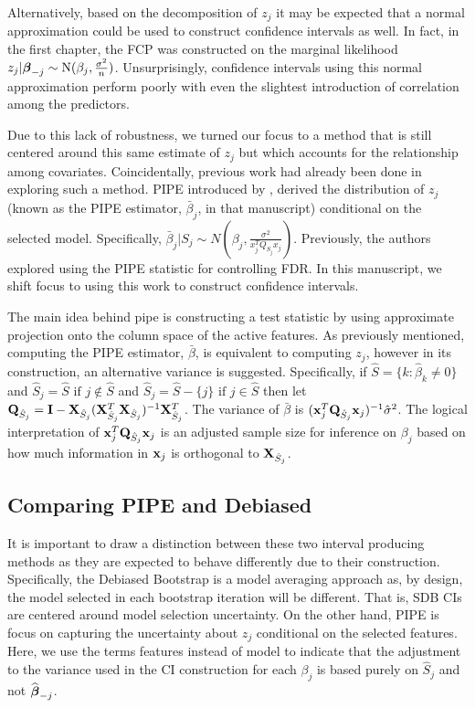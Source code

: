 Alternatively, based on the decomposition of $z_j$ it may be expected that a normal approximation could be used to construct confidence intervals as well. In fact, in the first chapter, the FCP was constructed on the marginal likelihood $z_j | \boldsymbol{\beta}_{-j} \sim \textrm{N}(\beta_j, \frac{\sigma^2}{n})$. Unsurprisingly, confidence intervals using this normal approximation perform poorly with even the slightest introduction of correlation among the predictors. 

Due to this lack of robustness, we turned our focus to a method that is still centered around this same estimate of $z_j$ but which accounts for the relationship among covariates. Coincidentally, previous work had already been done in exploring such a method. PIPE introduced by , derived the distribution of $z_j$ (known as the PIPE estimator, $\bar{\beta}_j$, in that manuscript) conditional on the selected model. Specifically, $\bar{\beta}_j | S_j \sim N(\beta_j, \frac{\sigma^2}{x_j^T Q_{S_j} x_j})$. Previously, the authors explored using the PIPE statistic for controlling FDR. In this manuscript, we shift focus to using this work to construct confidence intervals.

The main idea behind pipe is constructing a test statistic by using approximate projection onto the column space of the active features. As previously mentioned, computing the PIPE estimator, $\bar{\beta}$, is equivalent to computing $z_j$, however in its construction, an alternative variance is suggested. Specifically, if $\hat{S} = \lbrace k: \hat{\beta}_k \neq  0 \rbrace$ and $\hat{S}_j = \hat{S} \text{ if } j \notin \hat{S}$ and $\hat{S}_j = \hat{S} - \lbrace j \rbrace \text{ if } j \in \hat{S}$  then let $\mathbf{Q}_{\hat{S}_j} = \mathbf{I} - \mathbf{X}_{\hat{S}_j}(\mathbf{X}_{\hat{S}_j}^T \mathbf{X}_{\hat{S}_j})^{-1} \mathbf{X}_{\hat{S}_j}^T$. The variance of $\bar{\beta}$ is $(\mathbf{x}_j^T \mathbf{Q}_{\hat{S}_j} \mathbf{x}_j)^{-1}\hat{\sigma}^2$. The logical interpretation of $\mathbf{x}_j^T \mathbf{Q}_{\hat{S}_j} \mathbf{x}_j$ is an adjusted sample size for inference on $\beta_j$ based on how much information in $\mathbf{x}_j$ is orthogonal to $\mathbf{X}_{\hat{S}_j}$. 

\subsection{Comparing PIPE and Debiased}

It is important to draw a distinction between these two interval producing methods as they are expected to behave differently due to their construction. Specifically, the Debiased Bootstrap is a model averaging approach as, by design, the model selected in each bootstrap iteration will be different. That is, SDB CIs are centered around model selection uncertainty. On the other hand, PIPE is focus on capturing the uncertainty about $z_j$ conditional on the selected features. Here, we use the terms features instead of model to indicate that the adjustment to the variance used in the CI construction for each $\beta_j$ is based purely on $\hat{S}_j$ and not $\widehat{\boldsymbol{\beta}}_{-j}$.

